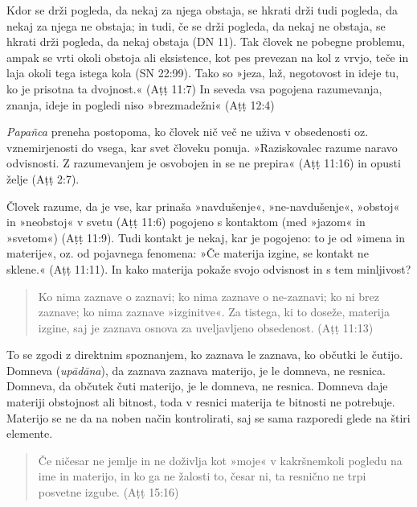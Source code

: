 Kdor se drži pogleda, da nekaj za njega obstaja, se hkrati drži tudi
pogleda, da nekaj za njega ne obstaja; in tudi, če se drži pogleda, da
nekaj ne obstaja, se hkrati drži pogleda, da nekaj obstaja (DN 11). Tak
človek ne pobegne problemu, ampak se vrti okoli obstoja ali eksistence,
kot pes prevezan na kol z vrvjo, teče in laja okoli tega istega kola (SN
22:99). Tako so »jeza, laž, negotovost in ideje tu, ko je prisotna ta
dvojnost.« (Aṭṭ 11:7) In seveda vsa pogojena razumevanja, znanja, ideje
in pogledi niso »brezmadežni« (Aṭṭ 12:4)

\emph{Papañca} preneha postopoma, ko človek nič več ne uživa v
obsedenosti oz. vznemirjenosti do vsega, kar svet človeku ponuja.
»Raziskovalec razume naravo odvisnosti. Z razumevanjem je osvobojen in
se ne prepira« (Aṭṭ 11:16) in opusti želje (Aṭṭ 2:7).

Človek razume, da je vse, kar prinaša »navdušenje«, »ne-navdušenje«,
»obstoj« in »neobstoj« v svetu (Aṭṭ 11:6) pogojeno s kontaktom (med
»jazom« in »svetom«) (Aṭṭ 11:9). Tudi kontakt je nekaj, kar je pogojeno:
to je od »imena in materije«, oz. od pojavnega fenomena: »Če materija
izgine, se kontakt ne sklene.« (Aṭṭ 11:11). In kako materija pokaže
svojo odvisnost in s tem minljivost?

\begin{quote}
Ko nima zaznave o zaznavi; ko nima zaznave o ne-zaznavi; ko ni brez
zaznave; ko nima zaznave »izginitve«. Za tistega, ki to doseže, materija
izgine, saj je zaznava osnova za uveljavljeno obsedenost. (Aṭṭ 11:13)
\end{quote}

To se zgodi z direktnim spoznanjem, ko zaznava le zaznava, ko občutki le
čutijo. Domneva (\emph{upādāna}), da zaznava zaznava materijo, je le
domneva, ne resnica. Domneva, da občutek čuti materijo, je le domneva,
ne resnica. Domneva daje materiji obstojnost ali bitnost, toda v resnici
materija te bitnosti ne potrebuje. Materijo se ne da na noben način
kontrolirati, saj se sama razporedi glede na štiri elemente.

\begin{quote}
Če ničesar ne jemlje in ne doživlja kot »moje« v kakršnemkoli pogledu na
ime in materijo, in ko ga ne žalosti to, česar ni, ta resnično ne trpi
posvetne izgube. (Aṭṭ 15:16)
\end{quote}

